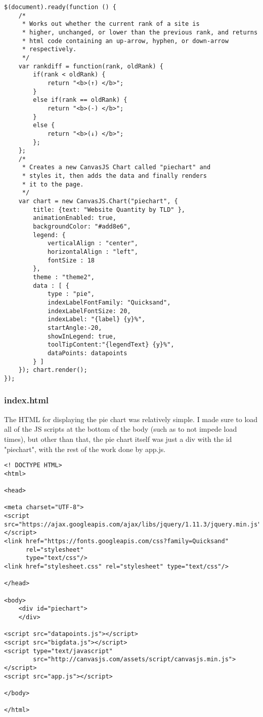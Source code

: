 \documentclass{article}
\begin{document}
\begin{lstlisting}
$(document).ready(function () {
    /*
     * Works out whether the current rank of a site is
     * higher, unchanged, or lower than the previous rank, and returns
     * html code containing an up-arrow, hyphen, or down-arrow
     * respectively.
     */
    var rankdiff = function(rank, oldRank) {
        if(rank < oldRank) {
            return "<b>(↑) </b>";
        }
        else if(rank == oldRank) {
            return "<b>(-) </b>";
        }
        else {
            return "<b>(↓) </b>";
        };
    };
    /*
     * Creates a new CanvasJS Chart called "piechart" and 
     * styles it, then adds the data and finally renders 
     * it to the page.
     */
    var chart = new CanvasJS.Chart("piechart", {
        title: {text: "Website Quantity by TLD" },
        animationEnabled: true,
        backgroundColor: "#add8e6",
        legend: {
            verticalAlign : "center",
            horizontalAlign : "left",
            fontSize : 18
        },
        theme : "theme2",
        data : [ {
            type : "pie",
            indexLabelFontFamily: "Quicksand",
            indexLabelFontSize: 20,
            indexLabel: "{label} {y}%",
            startAngle:-20,
            showInLegend: true,
            toolTipContent:"{legendText} {y}%",
            dataPoints: datapoints
        } ]
    }); chart.render();
});
\end{lstlisting}

\subsubsection{index.html}
The HTML for displaying the pie chart was relatively simple. I made sure to load all of the JS scripts at the bottom of the body (such as to not impede load times), but other than that, the pie chart itself was just a div with the id "piechart", with the rest of the work done by app.js. 
\begin{lstlisting}
<! DOCTYPE HTML>
<html>

<head>

<meta charset="UTF-8">
<script src="https://ajax.googleapis.com/ajax/libs/jquery/1.11.3/jquery.min.js">
</script>
<link href="https://fonts.googleapis.com/css?family=Quicksand"
      rel="stylesheet" 
      type="text/css"/>
<link href="stylesheet.css" rel="stylesheet" type="text/css"/>

</head>

<body>
    <div id="piechart">
    </div>
    
<script src="datapoints.js"></script>
<script src="bigdata.js"></script>
<script type="text/javascript" 
        src="http://canvasjs.com/assets/script/canvasjs.min.js"></script>
<script src="app.js"></script>

</body>

</html>
\end{lstlisting}
\end{document}
